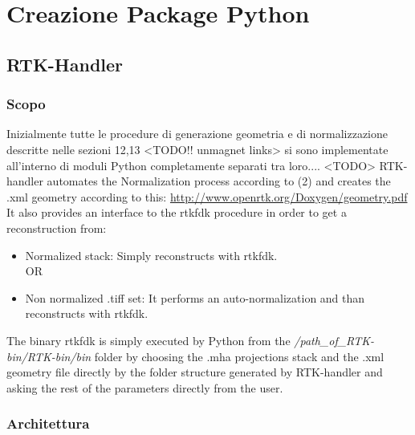 \documentclass[a4paper,12pt, doubleside]{report}
\begin{document}
            
            
    \chapter{Creazione Package Python}
        \section{RTK-Handler}
            \subsection{Scopo}
                \par 
                    Inizialmente tutte le procedure di generazione geometria e di normalizzazione descritte nelle sezioni 12,13 <TODO!! unmagnet links> si sono implementate all'interno di moduli Python completamente separati tra loro....
                    <TODO>
                    RTK-handler automates the Normalization process according to (2) and creates the .xml geometry according to this:\newline
                    \url{http://www.openrtk.org/Doxygen/geometry.pdf}\newline\newline
                    It also provides an interface to the rtkfdk procedure in order to get a reconstruction from:
                    \begin{itemize}
                    \item Normalized stack:
                    Simply reconstructs with rtkfdk.
                    \newline
                    \\OR
                    \item Non normalized .tiff set:
                        It performs an auto-normalization and than reconstructs with rtkfdk.\newline
                        \end{itemize}
                        The binary rtkfdk is simply executed by Python from the \textit{/path\_of\_RTK-bin/RTK-bin/bin} 
                        folder by choosing the .mha projections stack and the .xml geometry file directly by the folder structure generated by RTK-handler and asking the rest of the parameters directly from the user. 
            \subsection{Architettura}
\end{document}
